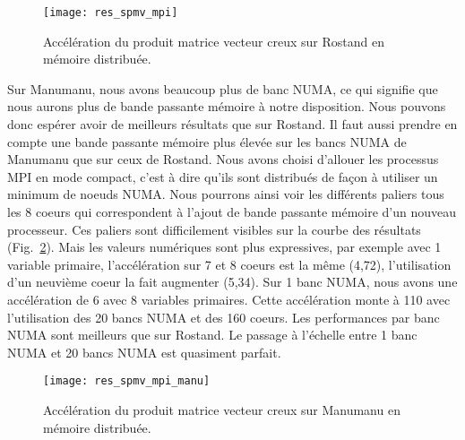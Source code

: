 \begin{figure}
  \centering
  \texttt{[image: res\_spmv\_mpi]}
  \caption{Accélération du produit matrice vecteur creux sur Rostand en mémoire distribuée.}
  \label{fig:res_spmv_mpi_rostand}
\end{figure}



Sur Manumanu, nous avons beaucoup plus de banc NUMA, ce qui signifie que nous aurons plus de bande passante mémoire à notre disposition.
%
Nous pouvons donc espérer avoir de meilleurs résultats que sur Rostand.
%
Il faut aussi prendre en compte une bande passante mémoire plus élevée sur les bancs NUMA de Manumanu que sur ceux de Rostand.
%
Nous avons choisi d'allouer les processus MPI en mode compact, c'est à dire qu'ils sont distribués de façon à utiliser un minimum de noeuds NUMA.
%
Nous pourrons ainsi voir les différents paliers tous les 8 coeurs qui correspondent à l'ajout de bande passante mémoire d'un nouveau processeur.
%
Ces paliers sont difficilement visibles sur la courbe des résultats (Fig.~\ref{fig:res_spmv_mpi_manumanu}).
%
Mais les valeurs numériques sont plus expressives, par exemple avec 1 variable primaire, l'accélération sur 7 et 8 coeurs est la même (4,72), l'utilisation d'un neuvième coeur la fait augmenter (5,34).
%
Sur 1 banc NUMA, nous avons une accélération de 6 avec 8 variables primaires.
%
Cette accélération monte à 110 avec l'utilisation des 20 bancs NUMA et des 160 coeurs.
%
Les performances par banc NUMA sont meilleurs que sur Rostand.
%
Le passage à l'échelle entre 1 banc NUMA et 20 bancs NUMA est quasiment parfait.


\begin{figure}
  \centering
  \texttt{[image: res\_spmv\_mpi\_manu]}
  \caption{Accélération du produit matrice vecteur creux sur Manumanu en mémoire distribuée.}
  \label{fig:res_spmv_mpi_manumanu}
\end{figure}
